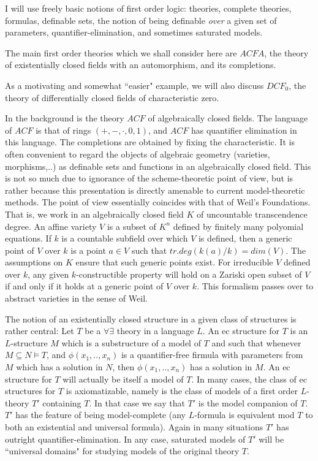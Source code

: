 I will use freely basic notions of first
order logic: theories, complete
theories, formulas, definable sets, the notion
of being definable {\em over} a given set of
parameters, quantifier-elimination, and
sometimes saturated models.

The
main first order theories which we shall
consider here are
$ACFA$, the theory of existentially closed
fields with an automorphism, and its
completions.

As a motivating and somewhat ``easier"
example, we will also discuss
$DCF_{0}$, the theory of differentially
closed fields of characteristic zero.

\vspace{5mm}
\noindent
In the background is the theory $ACF$ of
algebraically closed fields. The language of
$ACF$ is that of rings $(+,-,\cdot,0,1)$, and
$ACF$ has quantifier elimination in this
language. The completions are obtained by
fixing the characteristic. It is often
convenient to regard the objects of algebraic
geometry (varieties, morphisms,..) as definable
sets and functions in an algebraically closed
field. This is not so much due to
ignorance of the scheme-theoretic point of
view, but is rather because this presentation
is directly amenable to current model-theoretic
methods. The point of view essentially
coincides with that of Weil's Foundations. That
is, we work in an algebraically closed field
$K$ of uncountable transcendence degree. An
affine variety $V$ is a subset of $K^{n}$
defined by finitely many polyomial equations.
If $k$ is a countable subfield over which $V$
is defined, then a generic point of $V$ over
$k$ is a point $a\in V$ such that
$tr.deg(k(a)/k) = dim(V)$. The assumptions on
$K$ ensure that such generic points exist.
For irreducible $V$ defined over $k$, any given
$k$-constructible property will hold on a
Zariski open subset of $V$ if and only if it
holds at a generic point of $V$ over $k$.
This formalism passes over to abstract
varieties in the sense of Weil.

\vspace{5mm}
\noindent
The notion of an existentially closed
structure in a given class of structures is
rather central: Let $T$ be a $\forall\exists$
theory in a language $L$. An ec structure for
$T$ is an $L$-structure $M$ which is a
substructure of a model of $T$ and such that
whenever $M\subseteq N\models T$, and
$\phi(x_{1},..,x_{n})$ is a quantifier-free
firmula with parameters from $M$ which has a
solution in
$N$, then $\phi(x_{1},..,x_{n})$ has a solution
in
$M$. An ec structure for $T$ will actually be
itself a model of $T$. In many cases, the
class of ec structures for $T$ is
axiomatizable, namely is the class of models
of a first order
$L$-theory $T'$ containing $T$. In that case
we say that $T'$ is the model companion of
$T$. $T'$ has the feature of being
model-complete (any $L$-formula is equivalent
mod
$T$ to both an existential and universal
formula). Again in many situations $T'$ has
outright quantifier-elimination. In any case,
saturated models of $T'$ will be ``universal
domains" for studying models of the original
theory $T$.

